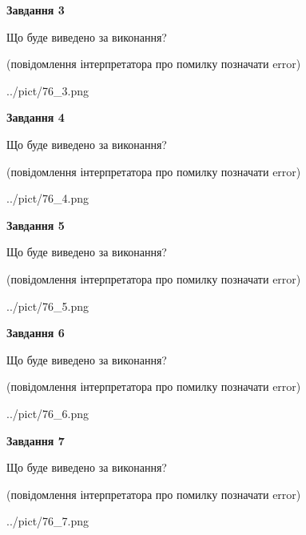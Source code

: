 \documentclass[12pt, ukrainian]{article}
\begin{document}
{\begin {large}
{\begin {center}\textbf{Завдання 3}\end {center}}\par
Що буде виведено за виконання?\par
 (повідомлення інтерпретатора про помилку позначати error)\par
\begin{center}
	{../pict/76_3.png}
\end{center}
\newpage

{\begin {center}\textbf{Завдання 4}\end {center}}\par
Що буде виведено за виконання?\par
 (повідомлення інтерпретатора про помилку позначати error)\par
\begin{center}
	{../pict/76_4.png}
\end{center}
\newpage

{\begin {center}\textbf{Завдання 5}\end {center}}\par
Що буде виведено за виконання?\par
 (повідомлення інтерпретатора про помилку позначати error)\par
\begin{center}
	{../pict/76_5.png}
\end{center}
\newpage

{\begin {center}\textbf{Завдання 6}\end {center}}\par
Що буде виведено за виконання?\par
 (повідомлення інтерпретатора про помилку позначати error)\par
\begin{center}
	{../pict/76_6.png}
\end{center}
\newpage

{\begin {center}\textbf{Завдання 7}\end {center}}\par
Що буде виведено за виконання?\par
 (повідомлення інтерпретатора про помилку позначати error)\par
\begin{center}
	{../pict/76_7.png}
\end{center}
\newpage


\end{large}}
\end{document}
